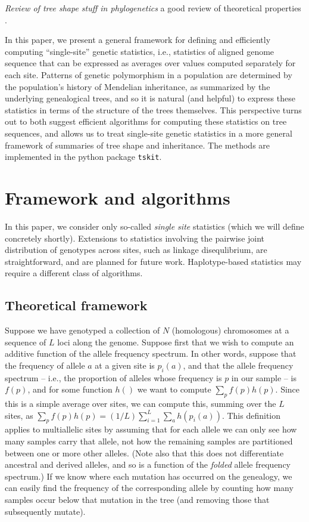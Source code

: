 \documentclass{article}
\newcommand{\tskit}{{\texttt{tskit}}}
\newcommand{\plr}[1]{{\color{blue} \it #1}}
\begin{document}
\plr{Review of tree shape stuff in phylogenetics}
a good review of theoretical properties \citet{semple_and_steel}.

In this paper, we present a general framework for defining and efficiently computing
``single-site'' genetic statistics,
i.e., statistics of aligned genome sequence that can be expressed as averages over values computed
separately for each site.
Patterns of genetic polymorphism in a population 
are determined by the population's history of Mendelian inheritance,
as summarized by the underlying genealogical trees,
and so it is natural (and helpful) to express these statistics
in terms of the structure of the trees themselves.
This perspective turns out to both suggest efficient algorithms 
for computing these statistics on tree sequences,
and allows us to treat single-site genetic statistics in a more general framework
of summaries of tree shape and inheritance.
The methods are implemented in the python package \tskit.


\section*{Framework and algorithms}

In this paper, 
we consider only so-called \emph{single site} statistics
(which we will define concretely shortly).
Extensions to statistics involving the pairwise joint distribution of genotypes across sites,
such as linkage disequlibrium,
are straightforward, and are planned for future work.
Haplotype-based statistics may require a different class of algorithms.


\subsection*{Theoretical framework}

Suppose we have genotyped a collection of $N$ (homologous) chromosomes
at a sequence of $L$ loci along the genome.
Suppose first that we wish to compute an additive function of the allele frequency spectrum.
In other words, suppose that the frequency of allele $a$ at a given site is $p_i(a)$,
and that the allele frequency spectrum 
-- i.e., the proportion of alleles whose frequency is $p$ in our sample -- is $f(p)$,
and for some function $h()$ we want to compute $\sum_p f(p) h(p)$.
Since this is a simple average over sites,
we can compute this, summing over the $L$ sites, as 
$\sum_p f(p) h(p) = (1/L) \sum_{i=1}^L \sum_a h(p_i(a))$.
This definition applies to multiallelic sites by assuming that for each allele
we can only see how many samples carry that allele,
not how the remaining samples are partitioned between one or more other alleles.
(Note also that this does not differentiate ancestral and derived alleles,
and so is a function of the \emph{folded} allele frequency spectrum.)
If we know where each mutation has occurred on the genealogy,
we can easily find the frequency of the corresponding allele by counting how many samples
occur below that mutation in the tree (and removing those that subsequently mutate).
\end{document}
